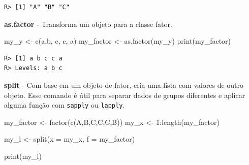 \documentclass[
  11pt,
]{book}
\newenvironment{Shaded}{\begin{snugshade}}{\end{snugshade}}
\newcommand{\AttributeTok}[1]{\textcolor[rgb]{0.61,0.61,0.61}{#1}}
\newcommand{\DecValTok}[1]{\textcolor[rgb]{0.06,0.06,0.06}{#1}}
\newcommand{\FunctionTok}[1]{\textcolor[rgb]{0,0,0}{#1}}
\newcommand{\NormalTok}[1]{#1}
\newcommand{\OtherTok}[1]{\textcolor[rgb]{0.37,0.37,0.37}{#1}}
\newcommand{\SpecialCharTok}[1]{\textcolor[rgb]{0,0,0}{#1}}
\newcommand{\StringTok}[1]{\textcolor[rgb]{0.5,0.5,0.5}{#1}}
\begin{document}
\begin{verbatim}
R> [1] "A" "B" "C"
\end{verbatim}

\textbf{as.factor} - Transforma um objeto para a classe fator.

\begin{Shaded}
\begin{Highlighting}[]
\NormalTok{my\_y }\OtherTok{\textless{}{-}} \FunctionTok{c}\NormalTok{(}\StringTok{\textquotesingle{}a\textquotesingle{}}\NormalTok{,}\StringTok{\textquotesingle{}b\textquotesingle{}}\NormalTok{, }\StringTok{\textquotesingle{}c\textquotesingle{}}\NormalTok{, }\StringTok{\textquotesingle{}c\textquotesingle{}}\NormalTok{, }\StringTok{\textquotesingle{}a\textquotesingle{}}\NormalTok{)}
\NormalTok{my\_factor }\OtherTok{\textless{}{-}} \FunctionTok{as.factor}\NormalTok{(my\_y)}
\FunctionTok{print}\NormalTok{(my\_factor)}
\end{Highlighting}
\end{Shaded}

\begin{verbatim}
R> [1] a b c c a
R> Levels: a b c
\end{verbatim}

\textbf{split} - Com base em um objeto de fator, cria uma lista com valores de outro objeto. Esse comando é útil para separar dados de grupos diferentes e aplicar alguma função com \texttt{sapply} ou \texttt{lapply}.

\begin{Shaded}
\begin{Highlighting}[]
\NormalTok{my\_factor }\OtherTok{\textless{}{-}} \FunctionTok{factor}\NormalTok{(}\FunctionTok{c}\NormalTok{(}\StringTok{\textquotesingle{}A\textquotesingle{}}\NormalTok{,}\StringTok{\textquotesingle{}B\textquotesingle{}}\NormalTok{,}\StringTok{\textquotesingle{}C\textquotesingle{}}\NormalTok{,}\StringTok{\textquotesingle{}C\textquotesingle{}}\NormalTok{,}\StringTok{\textquotesingle{}C\textquotesingle{}}\NormalTok{,}\StringTok{\textquotesingle{}B\textquotesingle{}}\NormalTok{))}
\NormalTok{my\_x }\OtherTok{\textless{}{-}} \DecValTok{1}\SpecialCharTok{:}\FunctionTok{length}\NormalTok{(my\_factor)}

\NormalTok{my\_l }\OtherTok{\textless{}{-}} \FunctionTok{split}\NormalTok{(}\AttributeTok{x =}\NormalTok{ my\_x, }\AttributeTok{f =}\NormalTok{ my\_factor)}

\FunctionTok{print}\NormalTok{(my\_l)}
\end{Highlighting}
\end{Shaded}
\end{document}
